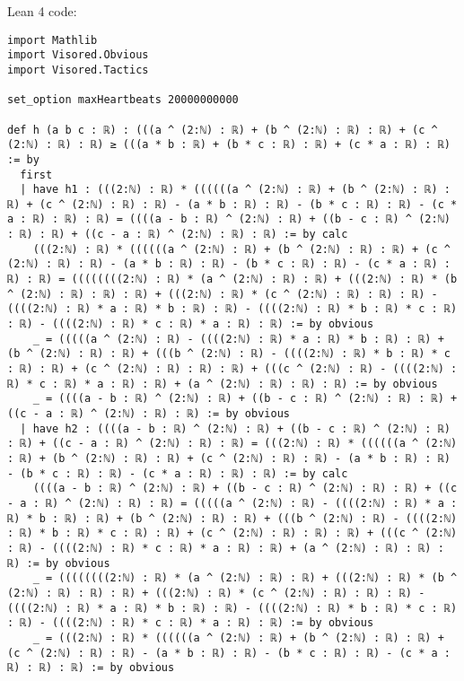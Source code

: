 \documentclass{article}
\begin{document}
Lean 4 code:
\begin{tcolorbox}[colback=white!10, width=\linewidth]
\begin{lstlisting}[language=Lean4]
import Mathlib
import Visored.Obvious
import Visored.Tactics

set_option maxHeartbeats 20000000000

def h (a b c : ℝ) : (((a ^ (2:ℕ) : ℝ) + (b ^ (2:ℕ) : ℝ) : ℝ) + (c ^ (2:ℕ) : ℝ) : ℝ) ≥ (((a * b : ℝ) + (b * c : ℝ) : ℝ) + (c * a : ℝ) : ℝ) := by
  first
  | have h1 : (((2:ℕ) : ℝ) * ((((((a ^ (2:ℕ) : ℝ) + (b ^ (2:ℕ) : ℝ) : ℝ) + (c ^ (2:ℕ) : ℝ) : ℝ) - (a * b : ℝ) : ℝ) - (b * c : ℝ) : ℝ) - (c * a : ℝ) : ℝ) : ℝ) = ((((a - b : ℝ) ^ (2:ℕ) : ℝ) + ((b - c : ℝ) ^ (2:ℕ) : ℝ) : ℝ) + ((c - a : ℝ) ^ (2:ℕ) : ℝ) : ℝ) := by calc
    (((2:ℕ) : ℝ) * ((((((a ^ (2:ℕ) : ℝ) + (b ^ (2:ℕ) : ℝ) : ℝ) + (c ^ (2:ℕ) : ℝ) : ℝ) - (a * b : ℝ) : ℝ) - (b * c : ℝ) : ℝ) - (c * a : ℝ) : ℝ) : ℝ) = ((((((((2:ℕ) : ℝ) * (a ^ (2:ℕ) : ℝ) : ℝ) + (((2:ℕ) : ℝ) * (b ^ (2:ℕ) : ℝ) : ℝ) : ℝ) + (((2:ℕ) : ℝ) * (c ^ (2:ℕ) : ℝ) : ℝ) : ℝ) - ((((2:ℕ) : ℝ) * a : ℝ) * b : ℝ) : ℝ) - ((((2:ℕ) : ℝ) * b : ℝ) * c : ℝ) : ℝ) - ((((2:ℕ) : ℝ) * c : ℝ) * a : ℝ) : ℝ) := by obvious
    _ = (((((a ^ (2:ℕ) : ℝ) - ((((2:ℕ) : ℝ) * a : ℝ) * b : ℝ) : ℝ) + (b ^ (2:ℕ) : ℝ) : ℝ) + (((b ^ (2:ℕ) : ℝ) - ((((2:ℕ) : ℝ) * b : ℝ) * c : ℝ) : ℝ) + (c ^ (2:ℕ) : ℝ) : ℝ) : ℝ) + (((c ^ (2:ℕ) : ℝ) - ((((2:ℕ) : ℝ) * c : ℝ) * a : ℝ) : ℝ) + (a ^ (2:ℕ) : ℝ) : ℝ) : ℝ) := by obvious
    _ = ((((a - b : ℝ) ^ (2:ℕ) : ℝ) + ((b - c : ℝ) ^ (2:ℕ) : ℝ) : ℝ) + ((c - a : ℝ) ^ (2:ℕ) : ℝ) : ℝ) := by obvious
  | have h2 : ((((a - b : ℝ) ^ (2:ℕ) : ℝ) + ((b - c : ℝ) ^ (2:ℕ) : ℝ) : ℝ) + ((c - a : ℝ) ^ (2:ℕ) : ℝ) : ℝ) = (((2:ℕ) : ℝ) * ((((((a ^ (2:ℕ) : ℝ) + (b ^ (2:ℕ) : ℝ) : ℝ) + (c ^ (2:ℕ) : ℝ) : ℝ) - (a * b : ℝ) : ℝ) - (b * c : ℝ) : ℝ) - (c * a : ℝ) : ℝ) : ℝ) := by calc
    ((((a - b : ℝ) ^ (2:ℕ) : ℝ) + ((b - c : ℝ) ^ (2:ℕ) : ℝ) : ℝ) + ((c - a : ℝ) ^ (2:ℕ) : ℝ) : ℝ) = (((((a ^ (2:ℕ) : ℝ) - ((((2:ℕ) : ℝ) * a : ℝ) * b : ℝ) : ℝ) + (b ^ (2:ℕ) : ℝ) : ℝ) + (((b ^ (2:ℕ) : ℝ) - ((((2:ℕ) : ℝ) * b : ℝ) * c : ℝ) : ℝ) + (c ^ (2:ℕ) : ℝ) : ℝ) : ℝ) + (((c ^ (2:ℕ) : ℝ) - ((((2:ℕ) : ℝ) * c : ℝ) * a : ℝ) : ℝ) + (a ^ (2:ℕ) : ℝ) : ℝ) : ℝ) := by obvious
    _ = ((((((((2:ℕ) : ℝ) * (a ^ (2:ℕ) : ℝ) : ℝ) + (((2:ℕ) : ℝ) * (b ^ (2:ℕ) : ℝ) : ℝ) : ℝ) + (((2:ℕ) : ℝ) * (c ^ (2:ℕ) : ℝ) : ℝ) : ℝ) - ((((2:ℕ) : ℝ) * a : ℝ) * b : ℝ) : ℝ) - ((((2:ℕ) : ℝ) * b : ℝ) * c : ℝ) : ℝ) - ((((2:ℕ) : ℝ) * c : ℝ) * a : ℝ) : ℝ) := by obvious
    _ = (((2:ℕ) : ℝ) * ((((((a ^ (2:ℕ) : ℝ) + (b ^ (2:ℕ) : ℝ) : ℝ) + (c ^ (2:ℕ) : ℝ) : ℝ) - (a * b : ℝ) : ℝ) - (b * c : ℝ) : ℝ) - (c * a : ℝ) : ℝ) : ℝ) := by obvious

\end{lstlisting}
\end{tcolorbox}
\end{document}
